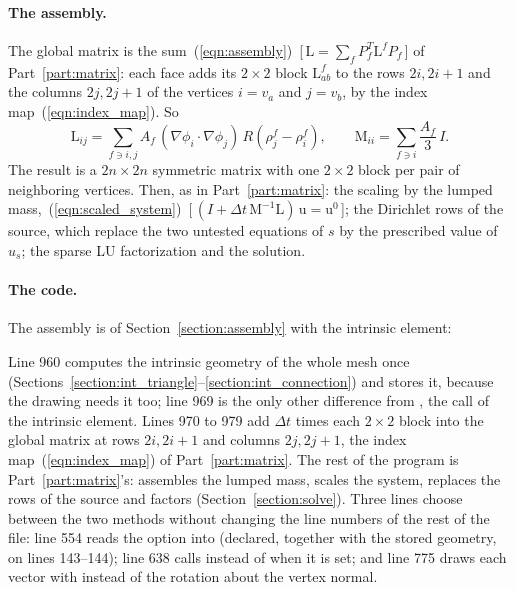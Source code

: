 \paragraph{The assembly.} The global matrix is the sum~(\ref{eqn:assembly})~[\,$\mathrm L = \sum_f P_f^T\mathrm L^fP_f$\,] of Part~\ref{part:matrix}: each face adds its $2\times 2$ block $\mathrm L^f_{ab}$ to the rows $2i, 2i+1$ and the columns $2j, 2j+1$ of the vertices $i = v_a$ and $j = v_b$, by the index map~(\ref{eqn:index_map}). So
\begin{equation*}
\mathrm L_{ij} = \sum_{f\ni i,j} A_f\,(\nabla\phi_i\cdot\nabla\phi_j)\,R(\rho_j^f - \rho_i^f), \qquad \mathrm M_{ii} = \sum_{f\ni i}\frac{A_f}{3}\, I .
\end{equation*}
The result is a $2n \times 2n$ symmetric matrix with one $2\times 2$ block per pair of neighboring vertices. Then, as in Part~\ref{part:matrix}: the scaling by the lumped mass,~(\ref{eqn:scaled_system})~[\,$(I + \Delta t\,\mathrm M^{-1}\mathrm L)\,\mathrm u = \mathrm u^0$\,]; the Dirichlet rows of the source, which replace the two untested equations of $s$ by the prescribed value of $u_s$; the sparse LU factorization and the solution.

\paragraph{The code.} The assembly is  of Section~\ref{section:assembly} with the intrinsic element:

Line 960 computes the intrinsic geometry of the whole mesh once (Sections~\ref{section:int_triangle}--\ref{section:int_connection}) and stores it, because the drawing needs it too; line 969 is the only other difference from , the call of the intrinsic element. Lines 970 to 979 add $\Delta t$ times each $2\times 2$ block into the global matrix at rows $2i, 2i+1$ and columns $2j, 2j+1$, the index map~(\ref{eqn:index_map}) of Part~\ref{part:matrix}. The rest of the program is Part~\ref{part:matrix}'s:  assembles the lumped mass, scales the system, replaces the rows of the source and factors (Section~\ref{section:solve}). Three lines choose between the two methods without changing the line numbers of the rest of the file: line 554 reads the option  into  (declared, together with the stored geometry, on lines 143--144); line 638 calls  instead of  when it is set; and line 775 draws each vector with  instead of the rotation about the vertex normal.

